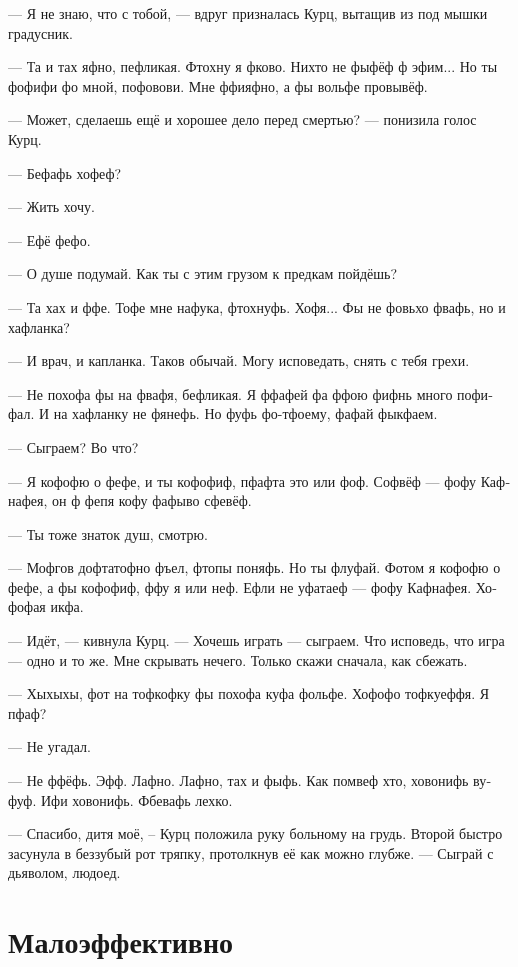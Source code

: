 \documentclass[a4paper,12pt,fleqn]{book}\usepackage{polyglossia}\setdefaultlanguage[babelshorthands=true]{russian}\setotherlanguage{english}\defaultfontfeatures{Ligatures=TeX,Mapping=tex-text}\usepackage{xcolor}\newcommand{\ml}[3]{#2}
\begin{document}
--- Я не знаю, что с тобой, --- вдруг призналась Курц, вытащив из под мышки градусник.

--- Та и тах яфно, пефликая.
Фтохну я фково.
Нихто не фыфёф ф эфим...
Но ты фофифи фо мной, пофовови.
Мне ффияфно, а фы вольфе провывёф.

--- Может, сделаешь ещё и хорошее дело перед смертью? --- понизила голос Курц.

--- Бефафь хофеф?

\ml{$0$}
{--- Жить хочу.}
{``I wanna live.''}

--- Ефё фефо.

\ml{$0$}
{--- О душе подумай.}
{``What about your soul?}
Как ты с этим грузом к предкам пойдёшь?

--- Та хах и ффе.
Тофе мне нафука, фтохнуфь.
Хофя...
Фы не фовьхо фвафь, но и хафланка?

--- И врач, и капланка.
\ml{$0$}
{Таков обычай.}
{It is our way.}
Могу исповедать, снять с тебя грехи.

--- Не похофа фы на фвафя, бефликая.
Я ффафей фа ффою фифнь много пофифал.
И на хафланку не фянефь.
Но фуфь фо-тфоему, фафай фыкфаем.

\ml{$0$}
{--- Сыграем?}
{``A game?}
\ml{$0$}
{Во что?}
{What game?''}

--- Я кофофю о фефе, и ты кофофиф, пфафта это или фоф.
Софвёф --- фофу Кафнафея, он ф фепя кофу фафыво сфевёф.

--- Ты тоже знаток душ, смотрю.

--- Мофгов дофтатофно фъел, фтопы поняфь.
Но ты флуфай.
Фотом я кофофю о фефе, а фы кофофиф, ффу я или неф.
Ефли не уфатаеф --- фофу Кафнафея.
Хофофая икфа.

--- Идёт, --- кивнула Курц.
--- Хочешь играть --- сыграем.
Что исповедь, что игра --- одно и то же.
Мне скрывать нечего.
Только скажи сначала, как сбежать.

--- Хыхыхы, фот на тофкофку фы похофа куфа фольфе.
Хофофо тофкуеффя.
Я пфаф?

\ml{$0$}
{--- Не угадал.}
{``Cold.''}

--- Не ффёфь.
Эфф.
Лафно.
Лафно, тах и фыфь.
Как помвеф хто, ховонифь вуфуф.
Ифи ховонифь.
Фбевафь лехко.

--- Спасибо, дитя моё, -- Курц положила руку больному на грудь.
Второй быстро засунула в беззубый рот тряпку, протолкнув её как можно глубже.
\ml{$0$}
{--- Сыграй с дьяволом, людоед.}
{``Play dead, cannibal.''}

\section{Малоэффективно}
\end{document}
